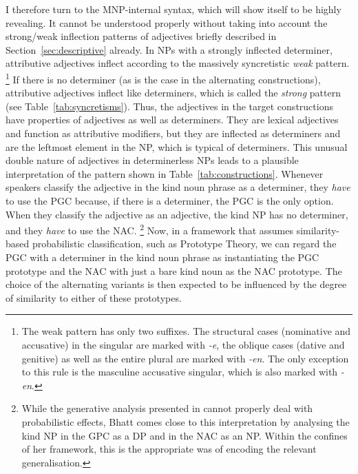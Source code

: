 \documentclass[USenglish]{article}
\begin{document}
I therefore turn to the MNP-internal syntax, which will show itself to be highly revealing.
It cannot be understood properly without taking into account the strong\slash weak inflection patterns of adjectives briefly described in Section~\ref{sec:descriptive} already.
In NPs with a strongly inflected determiner, attributive adjectives inflect according to the massively syncretistic \textit{weak} pattern.%
\footnote{The weak pattern has only two suffixes.
The structural cases (nominative and accusative) in the singular are marked with \textit{-e}, the oblique cases (dative and genitive) as well as the entire plural are marked with \textit{-en}.
The only exception to this rule is the masculine accusative singular, which is also marked with \textit{-en}.}
If there is no determiner (as is the case in the alternating constructions), attributive adjectives inflect like determiners, which is called the \textit{strong} pattern (see Table~\ref{tab:syncretisms}).
Thus, the adjectives in the target constructions have properties of adjectives as well as determiners.
They are lexical adjectives and function as attributive modifiers, but they are inflected as determiners and are the leftmost element in the NP, which is typical of determiners.
This unusual double nature of adjectives in determinerless NPs leads to a plausible interpretation of the pattern shown in Table~\ref{tab:constructions}.
Whenever speakers classify the adjective in the kind noun phrase as a determiner, they \textit{have} to use the PGC because, if there is a determiner, the PGC is the only option.
When they classify the adjective as an adjective, the kind NP has no determiner, and they \textit{have} to use the NAC.%
\footnote{While the generative analysis presented in \cite{Bhatt1990} cannot properly deal with probabilistic effects, Bhatt comes close to this interpretation by analysing the kind NP in the GPC as a DP and in the NAC as an NP.
Within the confines of her framework, this is the appropriate was of encoding the relevant generalisation.}
Now, in a framework that assumes similarity-based probabilistic classification, such as Prototype Theory, we can regard the PGC with a determiner in the kind noun phrase as instantiating the PGC prototype and the NAC with just a bare kind noun as the NAC prototype.
The choice of the alternating variants is then expected to be influenced by the degree of similarity to either of these prototypes.
\end{document}
